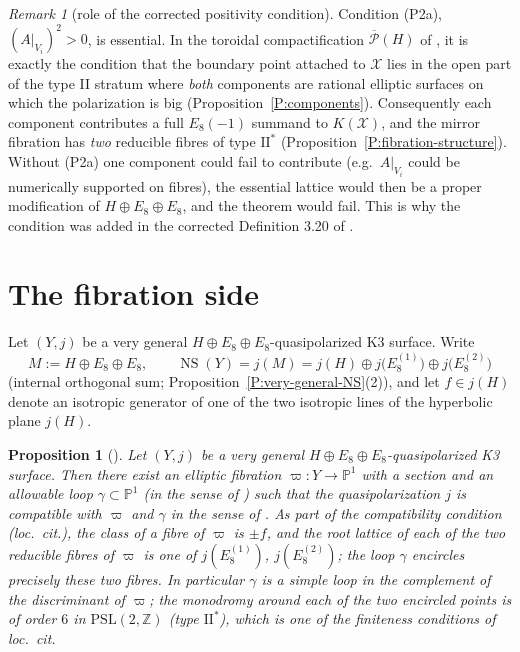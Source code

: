\documentclass[11pt]{amsart}
\theoremstyle{plain}
\newtheorem{proposition}[theorem]{Proposition}
\theoremstyle{definition}
\theoremstyle{remark}
\newtheorem{remark}[theorem]{Remark}
\numberwithin{equation}{section}
\begin{document}
\begin{remark}[role of the corrected positivity condition]\label{R:positivity}
Condition (P2a), \((A|_{V_{i}})^{2}>0\), is essential. In the toroidal
compactification \(\overline{\mathcal P}(H)\) of \cite{cmek3sspt}, it is
exactly the condition that the boundary point attached to \(\mathcal X\)
lies in the open part of the type II stratum where {\em both} components are
rational elliptic surfaces on which the polarization is big
(Proposition~\ref{P:components}). Consequently each component contributes a
full \(E_{8}(-1)\) summand to \(K(\mathcal X)\), and the mirror fibration has
{\em two} reducible fibres of type \(\mathrm{II}^{*}\)
(Proposition~\ref{P:fibration-structure}). Without (P2a) one component could
fail to contribute (e.g.\ \(A|_{V_{i}}\) could be numerically supported on
fibres), the essential lattice would then be a proper modification of
\(H\oplus E_{8}\oplus E_{8}\), and the theorem would fail. This is why the
condition was added in the corrected Definition 3.20 of \cite{dfk3slpms}.
\end{remark}

\section{The fibration side}\label{S:fibration}

Let \((Y,j)\) be a very general \(H\oplus E_{8}\oplus E_{8}\)-quasipolarized
K3 surface. Write
\[
M:=H\oplus E_{8}\oplus E_{8},\qquad
\operatorname{NS}(Y)=j(M)=j(H)\oplus j\bigl(E_{8}^{(1)}\bigr)\oplus
j\bigl(E_{8}^{(2)}\bigr)
\]
(internal orthogonal sum; Proposition~\ref{P:very-general-NS}(2)), and let
\(f\in j(H)\) denote an isotropic generator of one of the two isotropic
lines of the hyperbolic plane \(j(H)\).

\begin{proposition}[{\cite[\S 4]{dfk3slpms}}]\label{P:GT-fibration}
Let \((Y,j)\) be a very general \(H\oplus E_{8}\oplus E_{8}\)-quasipolarized
K3 surface. Then there exist an elliptic fibration
\(\varpi\colon Y\to\mathbb P^{1}\) with a section and an allowable loop
\(\gamma\subset\mathbb P^{1}\) (in the sense of
\cite[Definition 4.11]{dfk3slpms}) such that the quasipolarization \(j\) is
compatible with \(\varpi\) and \(\gamma\) in the sense of
\cite[Definition 4.21]{dfk3slpms}. As part of the compatibility condition
\emph{(loc.\ cit.)}, the class of a fibre of \(\varpi\) is
\(\pm f\), and the root lattice of each of the two reducible fibres of
\(\varpi\) is one of \(j(E_{8}^{(1)})\), \(j(E_{8}^{(2)})\); the loop
\(\gamma\) encircles precisely these two fibres. In particular
\(\gamma\) is a simple loop in the complement of the discriminant of
\(\varpi\); the monodromy around each of the two encircled points is of
order \(6\) in \(\mathrm{PSL}(2,\mathbb Z)\) (type \(\mathrm{II}^{*}\)),
which is one of the finiteness conditions of \emph{loc.\ cit.}
\end{proposition}
\end{document}
